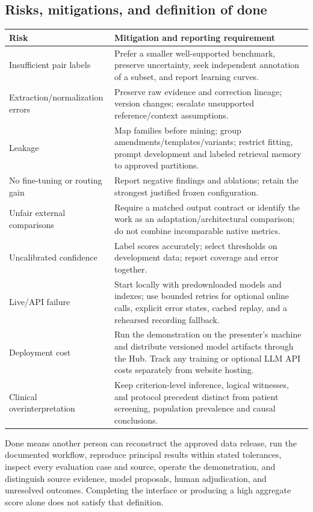 \documentclass[10pt,letterpaper]{article}
\begin{document}
\subsection{Risks, mitigations, and definition of done}
\begin{longtable}{L{.25\linewidth}L{.67\linewidth}}
\toprule Risk & Mitigation and reporting requirement\\\midrule
\endhead
Insufficient pair labels & Prefer a smaller well-supported benchmark, preserve uncertainty, seek independent annotation of a subset, and report learning curves.\\
Extraction/normalization errors & Preserve raw evidence and correction lineage; version changes; escalate unsupported reference/context assumptions.\\
Leakage & Map families before mining; group amendments/templates/variants; restrict fitting, prompt development and labeled retrieval memory to approved partitions.\\
No fine-tuning or routing gain & Report negative findings and ablations; retain the strongest justified frozen configuration.\\
Unfair external comparisons & Require a matched output contract or identify the work as an adaptation/architectural comparison; do not combine incomparable native metrics.\\
Uncalibrated confidence & Label scores accurately; select thresholds on development data; report coverage and error together.\\
Live/API failure & Start locally with predownloaded models and indexes; use bounded retries for optional online calls, explicit error states, cached replay, and a rehearsed recording fallback.\\
Deployment cost & Run the demonstration on the presenter's machine and distribute versioned model artifacts through the Hub. Track any training or optional LLM API costs separately from website hosting.\\
Clinical overinterpretation & Keep criterion-level inference, logical witnesses, and protocol precedent distinct from patient screening, population prevalence and causal conclusions.\\\bottomrule
\end{longtable}

Done means another person can reconstruct the approved data release, run the
documented workflow, reproduce principal results within stated tolerances,
inspect every evaluation case and source, operate the demonstration, and
distinguish source evidence, model proposals, human adjudication, and
unresolved outcomes. Completing the interface or producing a high aggregate
score alone does not satisfy that definition.
\end{document}

